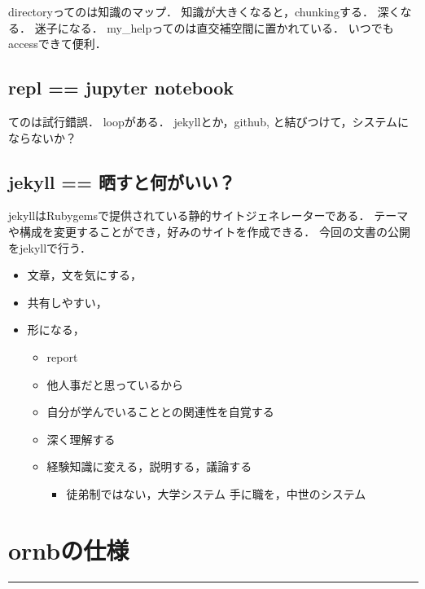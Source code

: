 \documentclass{jsarticle}
\begin{document}
directoryってのは知識のマップ．
知識が大きくなると，chunkingする．
深くなる．
迷子になる．
my\_helpってのは直交補空間に置かれている．
いつでもaccessできて便利．

\subsection{repl == jupyter notebook}
\label{sec:orgc36fa9b}
てのは試行錯誤．
loopがある．
jekyllとか，github, と結びつけて，システムにならないか？

\subsection{jekyll == 晒すと何がいい？}
\label{sec:org2c71569}
jekyllはRubygemsで提供されている静的サイトジェネレーターである．
テーマや構成を変更することができ，好みのサイトを作成できる．
今回の文書の公開をjekyllで行う．
\begin{itemize}
\item 文章，文を気にする，
\item 共有しやすい，
\item 形になる，
\begin{itemize}
\item report
\item 他人事だと思っているから
\item 自分が学んでいることとの関連性を自覚する
\item 深く理解する
\item 経験知識に変える，説明する，議論する
\begin{itemize}
\item 徒弟制ではない，大学システム
手に職を，中世のシステム
\end{itemize}
\end{itemize}
\end{itemize}

\section{ornbの仕様}
\label{sec:org1b90e46}


\noindent\rule{\textwidth}{0.5pt}
\end{document}
